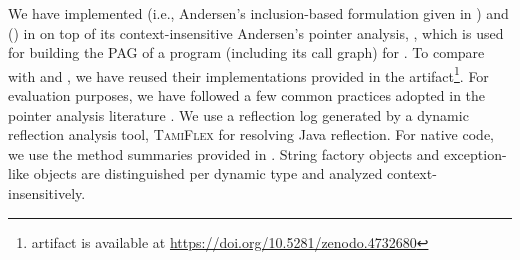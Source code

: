 We have implemented  (i.e., Andersen's inclusion-based formulation given in ) and \tool ()
in  \soot \cite{vallee2010soot} on top of its context-insensitive Andersen's pointer analysis, \spark \cite{lhotak2003scaling},
which is used for building the PAG of 
a program (including its call graph) for \tool. To compare \tool with \selectx and \zipper, we have reused their implementations provided in the \selectx artifact\footnote{\selectx artifact is available at \url{https://doi.org/10.5281/zenodo.4732680}}.
For evaluation purposes,
we have followed a few common practices adopted in the pointer analysis literature \cite{lu2019precision, lu2021selective, lu2021eagle, raghothaman2018user, tan2017efficient, He2021Turner, he2021context}. We use a reflection log generated by a dynamic reflection analysis tool, \textsc{TamiFlex} \cite{bodden2011taming} for resolving Java reflection. For native code, we use the method summaries provided in \soot. String factory objects and exception-like objects are distinguished per dynamic type and analyzed context-insensitively.


